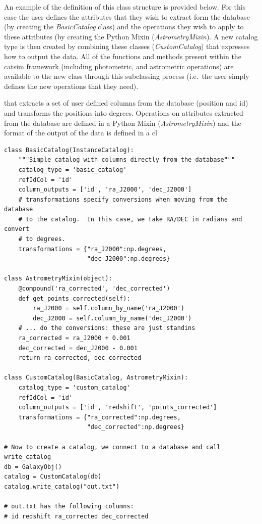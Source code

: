 \documentclass[]{article}
\begin{document}
An example of the definition of this class structure is provided
below. For this case the user defines the attributes that they wish to
extract form the database (by creating the {\it BasicCatalog} class)
and the operations they wish to apply to these attributes (by creating
the Python Mixin ({\it AstrometryMixin}). A new catalog type is then
created by combining these classes ({\it CustomCatalog}) that
expresses how to output the data. All of the functions and methods
present within the catsim framework (including photometric, and
astrometric operations) are available to the new class through this
subclassing process (i.e.\ the user simply defines the new operations
that they need).


that extracts a set of user defined columns
from the database (position and id) and transforms the positions into
degrees. Operations on attributes extracted from the database are
defined in a Python Mixin ({\it AstrometryMixin}) and the format of
the output of
the data is defined in a cl 

\begin{verbatim}
class BasicCatalog(InstanceCatalog):
    """Simple catalog with columns directly from the database"""
    catalog_type = 'basic_catalog'
    refIdCol = 'id'
    column_outputs = ['id', 'ra_J2000', 'dec_J2000']
    # transformations specify conversions when moving from the database
    # to the catalog.  In this case, we take RA/DEC in radians and convert
    # to degrees.
    transformations = {"ra_J2000":np.degrees,
                       "dec_J2000":np.degrees}

class AstrometryMixin(object):
    @compound('ra_corrected', 'dec_corrected')
    def get_points_corrected(self):
        ra_J2000 = self.column_by_name('ra_J2000')
        dec_J2000 = self.column_by_name('dec_J2000')
    # ... do the conversions: these are just standins
    ra_corrected = ra_J2000 + 0.001
    dec_corrected = dec_J2000 - 0.001
    return ra_corrected, dec_corrected

class CustomCatalog(BasicCatalog, AstrometryMixin):
    catalog_type = 'custom_catalog'
    refIdCol = 'id'
    column_outputs = ['id', 'redshift', 'points_corrected']
    transformations = {"ra_corrected":np.degrees,
                       "dec_corrected":np.degrees}

# Now to create a catalog, we connect to a database and call write_catalog
db = GalaxyObj()
catalog = CustomCatalog(db)
catalog.write_catalog("out.txt")

# out.txt has the following columns:
# id redshift ra_corrected dec_corrected
\end{verbatim}
\end{document}
